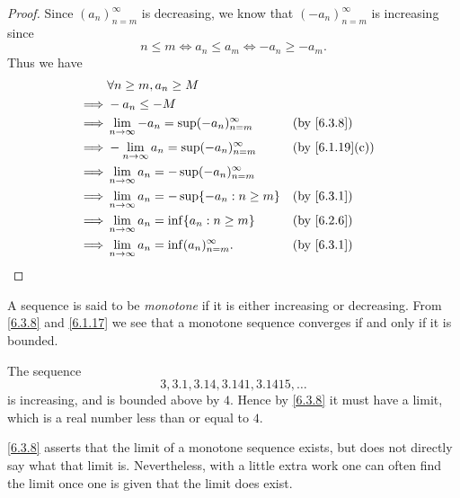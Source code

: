 \begin{proof}
  Since \((a_n)_{n = m}^\infty\) is decreasing, we know that \((-a_n)_{n = m}^\infty\) is increasing since
  \[
    n \leq m \iff a_n \leq a_m \iff -a_n \geq -a_m.
  \]
  Thus we have
  \begin{align*}
             & \forall n \geq m, a_n \geq M                                                           \\
    \implies & -a_n \leq -M                                                                           \\
    \implies & \lim_{n \to \infty} -a_n = \sup(-a_n)_{n = m}^\infty &  & \by{6.3.8}                   \\
    \implies & -\lim_{n \to \infty} a_n = \sup(-a_n)_{n = m}^\infty &  & \text{(by \cref{6.1.19}(c))} \\
    \implies & \lim_{n \to \infty} a_n = -\sup(-a_n)_{n = m}^\infty                                   \\
    \implies & \lim_{n \to \infty} a_n = -\sup\{-a_n : n \geq m\}   &  & \by{6.3.1}                   \\
    \implies & \lim_{n \to \infty} a_n = \inf\{a_n : n \geq m\}     &  & \by{6.2.6}                   \\
    \implies & \lim_{n \to \infty} a_n = \inf(a_n)_{n = m}^\infty.  &  & \by{6.3.1}
  \end{align*}
\end{proof}

\begin{note}
  A sequence is said to be \emph{monotone} if it is either increasing or decreasing.
  From \cref{6.3.8} and \cref{6.1.17} we see that a monotone sequence converges if and only if it is bounded.
\end{note}

\begin{eg}\label{6.3.9}
  The sequence
  \[
    3, 3.1, 3.14, 3.141, 3.1415, \dots
  \]
  is increasing, and is bounded above by \(4\).
  Hence by \cref{6.3.8} it must have a limit, which is a real number less than or equal to \(4\).
\end{eg}

\begin{note}
  \cref{6.3.8} asserts that the limit of a monotone sequence exists, but does not directly say what that limit is.
  Nevertheless, with a little extra work one can often find the limit once one is given that the limit does exist.
\end{note}

